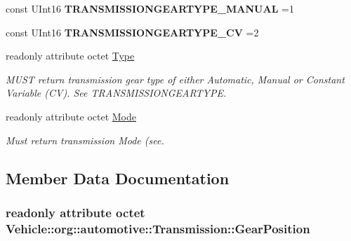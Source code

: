 \begin{DoxyCompactItemize}
\item 
\hypertarget{interfaceVehicle_1_1org_1_1automotive_1_1Transmission_a4e91967b7f5c213244a86f930159e4f2}{const U\-Int16 {\bfseries T\-R\-A\-N\-S\-M\-I\-S\-S\-I\-O\-N\-G\-E\-A\-R\-T\-Y\-P\-E\-\_\-\-M\-A\-N\-U\-A\-L} =1}\label{interfaceVehicle_1_1org_1_1automotive_1_1Transmission_a4e91967b7f5c213244a86f930159e4f2}

\item 
\hypertarget{interfaceVehicle_1_1org_1_1automotive_1_1Transmission_aff634ef303d35c3d92af66f7ff9ff56e}{const U\-Int16 {\bfseries T\-R\-A\-N\-S\-M\-I\-S\-S\-I\-O\-N\-G\-E\-A\-R\-T\-Y\-P\-E\-\_\-\-C\-V} =2}\label{interfaceVehicle_1_1org_1_1automotive_1_1Transmission_aff634ef303d35c3d92af66f7ff9ff56e}

\item 
readonly attribute octet \hyperlink{interfaceVehicle_1_1org_1_1automotive_1_1Transmission_a56c8d4074ca7dfc581c0ce78a1ebd11a}{Type}
\begin{DoxyCompactList}\small\item\em M\-U\-S\-T return transmission gear type of either Automatic, Manual or Constant Variable (C\-V). See T\-R\-A\-N\-S\-M\-I\-S\-S\-I\-O\-N\-G\-E\-A\-R\-T\-Y\-P\-E. \end{DoxyCompactList}\item 
readonly attribute octet \hyperlink{interfaceVehicle_1_1org_1_1automotive_1_1Transmission_a31b7f50d2c48f916d82df0699d1cf2b2}{Mode}
\begin{DoxyCompactList}\small\item\em Must return transmission Mode (see. \end{DoxyCompactList}\end{DoxyCompactItemize}


\subsection{Member Data Documentation}
\hypertarget{interfaceVehicle_1_1org_1_1automotive_1_1Transmission_ac3ae5ab8450c0b1f234f15634577fc0f}{
\subsubsection[{Gear\-Position}]{\setlength{\rightskip}{0pt plus 5cm}readonly attribute octet Vehicle\-::org\-::automotive\-::\-Transmission\-::\-Gear\-Position}}\label{interfaceVehicle_1_1org_1_1automotive_1_1Transmission_ac3ae5ab8450c0b1f234f15634577fc0f}


